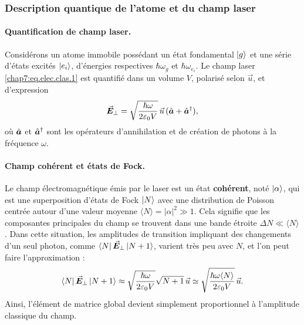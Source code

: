 \subsubsection{Description quantique de l’atome et du champ laser}

\paragraph{Quantification de champ laser.}

Considérons un atome immobile possédant un état fondamental \( \ket{g} \) et une série d’états excités \( \ket{e_i} \), d’énergies respectives \( \hbar\omega_g \) et \( \hbar\omega_{e_i} \). Le champ laser \eqref{chap7:eq.elec.clas.1} est quantifié dans un volume \( V \), polarisé selon \( \vec{u} \),  et d'expression \cite{??}
\begin{eqnarray}\label{chap7:eq.elec.quat.1}
	\vec{{\bm{E}}}_\perp = \sqrt{\frac{\hbar \omega}{2\varepsilon_0 V}} \, \vec{u} \, (\hat{\bm{a}} + \hat{\bm{a}}^\dagger),	
\end{eqnarray}
où \( \hat{\bm{a}} \) et \( \hat{\bm{a}}^\dagger \) sont les opérateurs d’annihilation et de création de photons à la fréquence \( \omega \).

\medskip


\paragraph{Champ cohérent et états de Fock.} Le champ électromagnétique émis par le laser est un état \textbf{cohérent}, noté \( \ket{\alpha} \), qui est une superposition d’états de Fock \( \ket{N} \) avec une distribution de Poisson centrée autour d’une valeur moyenne \( \langle N \rangle  = \vert \alpha \vert ^2 \gg 1 \). Cela signifie que les composantes principales du champ se trouvent dans une bande étroite \( \Delta N \ll \langle N \rangle \). Dans cette situation, les amplitudes de transition impliquant des changements d’un seul photon, comme \( \bra{N} \vec{{\bm{E}}}_\perp \ket{N+1} \), varient très peu avec \( N \), et l’on peut faire l’approximation :
\begin{eqnarray}
\bra{N} \vec{{\bm{E}}}_\perp \ket{N+1} \approx \sqrt{\frac{\hbar \omega}{2\varepsilon_0 V}}  \sqrt{N+1} \, \vec{u} \simeq \sqrt{\frac{\hbar \omega \langle N \rangle}{2\varepsilon_0 V}} \, \vec{u} .
\end{eqnarray}
Ainsi, l’élément de matrice global devient simplement proportionnel à l’amplitude classique du champ.

